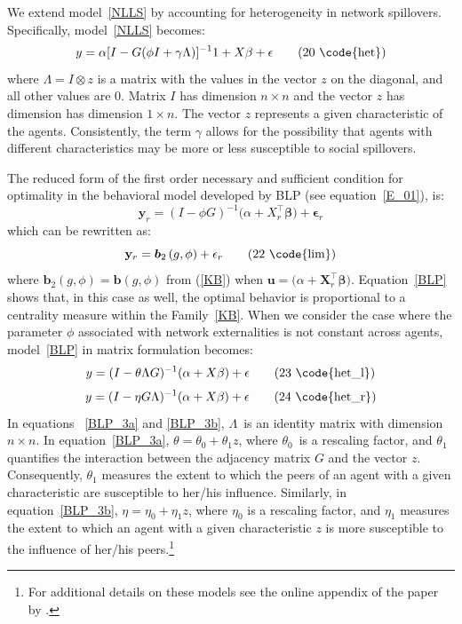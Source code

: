 \documentclass[nojss]{jss}
\begin{document}
We extend model~\ref{NLLS} by accounting for heterogeneity in network spillovers. Specifically, model~\ref{NLLS} becomes:
\begin{equation}
y=\alpha \lbrack I-G(\phi I+\gamma \Lambda )]^{-1}1+X\mathbf{\beta }+\mathbf{\epsilon }   \tag{20 \code{het}}
\label{BP_2}
\end{equation}
\setcounter{equation}{20}
where $\Lambda =I\otimes z$ is a matrix with the values in the vector $z$ on the diagonal, and all other values are 0. Matrix $I$ has dimension $n \times n$ and the vector $z$ has dimension has dimension $1\times n$. The vector $z$ represents a given characteristic of the agents. Consistently, the term $\gamma$ allows for the possibility that agents with different characteristics may be more or less susceptible to social spillovers.

The reduced form of the first order necessary and sufficient condition for optimality in the behavioral model developed by BLP (see equation~\ref{E_01}), is: 
\begin{equation}
\mathbf{y}_{r}=\left(I-\phi G\right) ^{-1}(\alpha
+X_{r}^\top\mathbf{\beta )}+\mathbf{\epsilon }_{r}
\label{BLP0}
\end{equation}
which can be rewritten as:
\begin{equation}
\mathbf{y}_{r}=\boldsymbol{b}_{2}\left( g,\phi \right)+\mathbf{\epsilon}_{r}  \tag{22 \code{lim}}
\label{BLP}
\end{equation}
where $\boldsymbol{b}_{2}\left( g,\phi \right) =\boldsymbol{b}\left( g,\phi
\right) $ from (\ref{KB}) when $\boldsymbol{u}=(\alpha +\boldsymbol{X}_{r}^\top\mathbf{\beta)}$. Equation~\ref{BLP} shows that, in this case as well, the optimal behavior is proportional to a centrality measure within the Family~\ref{KB}.
When we consider the case where the parameter $\phi$ associated with network externalities is not constant across agents, model~\ref{BLP} in matrix formulation becomes:
\begin{equation}
y=(I-\theta \Lambda G)^{-1}(\alpha +X\mathbf{\beta })+\mathbf{\epsilon} \tag{23 \code{het\_l}}
\label{BLP_3a}
\end{equation}
\begin{equation}
y=(I-\eta G\Lambda)^{-1}(\alpha +X\mathbf{\beta })+\mathbf{\epsilon} \tag{24 \code{het\_r}}
\label{BLP_3b}
\end{equation}
In equations ~\ref{BLP_3a} and \ref{BLP_3b}, $\Lambda $\ is an identity matrix with dimension $n \times n$. In equation~\ref{BLP_3a}, $\theta =\theta _{0}+\theta _{1}z$, where $\theta _{0}$\ is a rescaling factor, and $\theta _{1}$ quantifies the interaction between the adjacency matrix $G$ and the vector $z$. Consequently, $\theta _{1}$ measures the extent to which the peers of an agent with a given characteristic are susceptible to her/his influence. Similarly, in equation~\ref{BLP_3b}, $\eta =\eta _{0}+\eta _{1}z$, where $\eta _{0}$ is a rescaling factor, and $\eta _{1}$ measures the extent to which an agent with a given characteristic $z$ is more susceptible to the influence of her/his peers.\footnote{For additional details on these models see the online appendix of the paper by \cite{Battaglini+Sciabolazza+Patacchini:2020}.}
\end{document}

